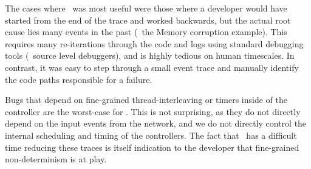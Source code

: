 The cases where \projectname~was most useful were those where a developer would
have started from
the end of the trace and worked backwards, but
the actual root cause lies many events in the past (\eg~the Memory corruption
example). This requires many re-iterations through the code and logs using standard
debugging tools (\eg~source level debuggers), and
is highly tedious on human timescales. In contrast, it was easy to step
through a small event trace and manually identify the code paths responsible
for a failure.

Bugs that depend on fine-grained thread-interleaving or timers
inside of the controller are the worst-case for \projectname. This
is not surprising, as they do not directly depend on the input events from the
network, and we do not directly control the internal scheduling and timing
of the controllers. The fact that \projectname~has a difficult time reducing
these traces is itself indication to the developer that fine-grained non-determinism is at
play.



%



%

